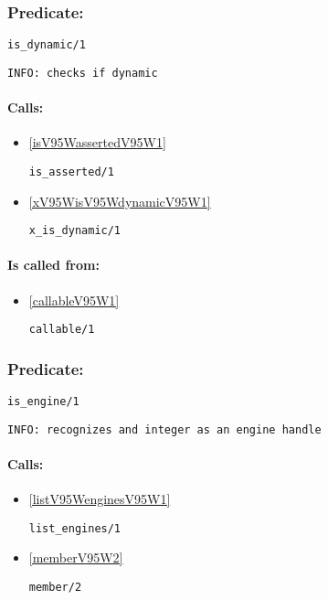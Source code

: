 \subsubsection{Predicate:} \label{isV95WdynamicV95W1}

\begin{verbatim}
is_dynamic/1
\end{verbatim}

{\small \begin{verbatim}
INFO: checks if dynamic

\end{verbatim}}
\paragraph{Calls:} 
\begin{itemize}
\item \ref{isV95WassertedV95W1} 
\begin{verbatim}
is_asserted/1
\end{verbatim}

\item \ref{xV95WisV95WdynamicV95W1} 
\begin{verbatim}
x_is_dynamic/1
\end{verbatim}

\end{itemize}
\paragraph{Is called from:} 
\begin{itemize}
\item \ref{callableV95W1} 
\begin{verbatim}
callable/1
\end{verbatim}

\end{itemize}

\subsubsection{Predicate:} \label{isV95WengineV95W1}

\begin{verbatim}
is_engine/1
\end{verbatim}

{\small \begin{verbatim}
INFO: recognizes and integer as an engine handle

\end{verbatim}}
\paragraph{Calls:} 
\begin{itemize}
\item \ref{listV95WenginesV95W1} 
\begin{verbatim}
list_engines/1
\end{verbatim}

\item \ref{memberV95W2} 
\begin{verbatim}
member/2
\end{verbatim}

\end{itemize}

